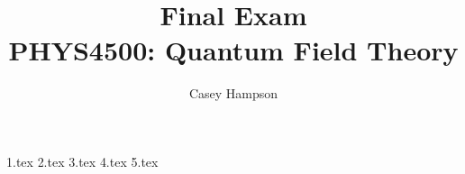 \documentclass[titlepage]{article}
\title{Final Exam \\[5pt] PHYS4500: Quantum Field Theory}
\author{Casey Hampson}
\begin{document}
    \maketitle
    \pagebreak

    {1.tex}
    {2.tex}
    {3.tex}
    {4.tex}
    {5.tex}
\end{document}
